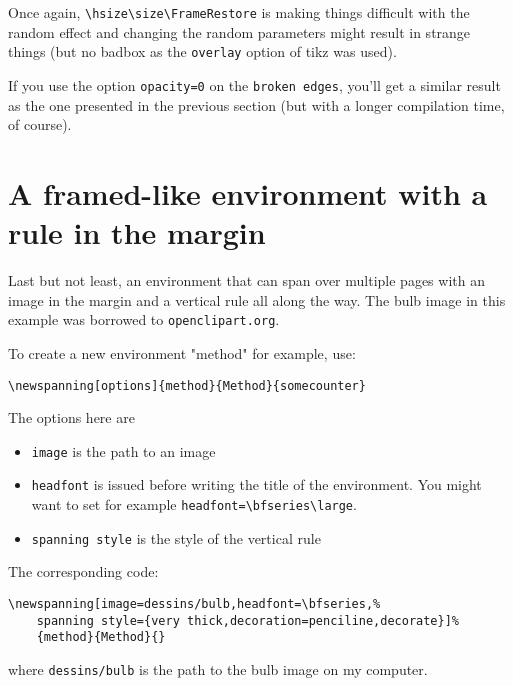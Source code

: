\documentclass[11pt,oneside]{article}
\begin{document}
Once again, \verb!\hsize\size\FrameRestore! is making things difficult
with the random effect and changing the random parameters might result
in strange things (but no badbox as the \verb!overlay! option of tikz
was used).

If you use the option \verb!opacity=0! on the \verb!broken edges!, you'll
get a similar result as the one presented in the previous section (but
with a longer compilation time, of course).


\section{A framed-like environment with a rule in the margin}

Last but not least, an environment that can span over multiple pages with an
image in the margin and a vertical rule all along the way. The bulb image in 
this example was borrowed to \texttt{openclipart.org}.

To create a new environment "method" for example, use:
\begin{verbatim}
\newspanning[options]{method}{Method}{somecounter}
\end{verbatim}
 The options here are
\begin{itemize}
    \item \verb!image! is the path to an image
    \item \verb!headfont! is issued before writing the title of the
        environment. You 
        might want to set for example \verb!headfont=\bfseries\large!.
    \item \verb!spanning style! is the style of the vertical rule
\end{itemize}

\begin{method}
    \lipsum[1-10]
\end{method}

The corresponding code:
\begin{verbatim}
\newspanning[image=dessins/bulb,headfont=\bfseries,%
    spanning style={very thick,decoration=penciline,decorate}]%
    {method}{Method}{}
\end{verbatim}
where \verb!dessins/bulb! is the path to the bulb image on my computer.
\end{document}
